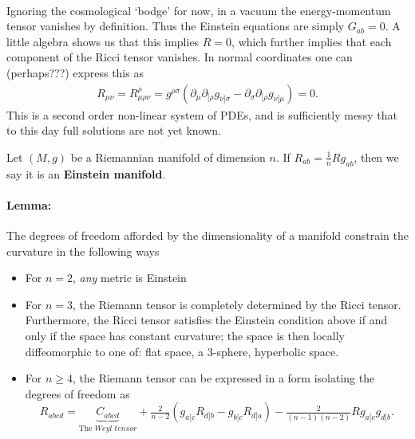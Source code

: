 \documentclass[11pt,fleqn]{report}
\begin{document}
\paragraph{} Ignoring the cosmological `bodge' for now, in a vacuum the energy-momentum tensor vanishes by definition. Thus the Einstein equations are simply $G_{ab} = 0$. A little algebra shows us that this implies $R = 0$, which further implies that each component of the Ricci tensor vanishes. In normal coordinates one can (perhaps???) express this as
	\begin{align}
		R_{\mu \nu} = R^\rho_{\mu \rho \nu} = g^{\rho \sigma} \left( \partial_{\mu} \partial_{[\rho} g_{\nu] \sigma} - \partial_\sigma \partial_{[\rho} g_{\nu] \mu} \right) = 0.
	\end{align}
This is a second order non-linear system of PDEs, and is sufficiently messy that to this day full solutions are not yet known.


\begin{definition}
	Let $(M,g)$ be a Riemannian manifold of dimension $n$. If ${R_{ab} = \tfrac{1}{n} R g_{ab}}$, then we say it is an \textbf{Einstein manifold}.
\end{definition}

\paragraph{Lemma:} The degrees of freedom afforded by the dimensionality of a manifold constrain the curvature in the following ways
	\begin{itemize}
		\item For $n = 2$, \textit{any} metric is Einstein
		\item For $n = 3$, the Riemann tensor is completely determined by the Ricci tensor. Furthermore, the Ricci tensor satisfies the Einstein condition above if and only if the space has constant curvature; the space is then locally diffeomorphic to one of: flat space, a 3-sphere, hyperbolic space.
		\item For $n \geq 4$, the Riemann tensor can be expressed in a form isolating the degrees of freedom as
			\begin{equation}
				R_{abcd} = \underbrace{C_{abcd}}_{\text{The }\textit{Weyl tensor}} + \tfrac{2}{n-2} \left(g_{a[c} R_{d]b} - g_{b [c} R_{d] a} \right) - \tfrac{2}{(n-1)(n-2)}R g_{a [c} g_{d] b}.
			\end{equation}
	\end{itemize}
\end{document}
